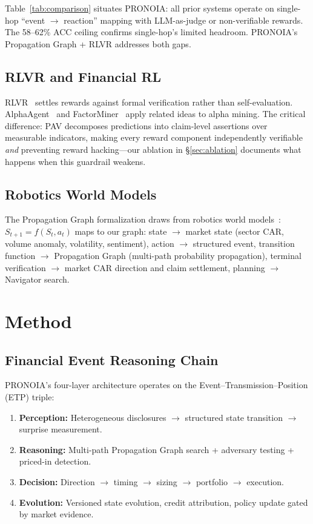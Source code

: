 \documentclass[sigconf, anonymous, review]{acmart}
\begin{document}
Table~\ref{tab:comparison} situates PRONOIA: all prior systems operate on single-hop ``event $\to$ reaction'' mapping with LLM-as-judge or non-verifiable rewards. The 58--62\% ACC ceiling confirms single-hop's limited headroom. PRONOIA's Propagation Graph + RLVR addresses both gaps.

\subsection{RLVR and Financial RL}

RLVR~\cite{rlvr2025} settles rewards against formal verification rather than self-evaluation. AlphaAgent~\cite{alphaagent2025} and FactorMiner~\cite{factorminer2026} apply related ideas to alpha mining. The critical difference: PAV decomposes predictions into claim-level assertions over measurable indicators, making every reward component independently verifiable \emph{and} preventing reward hacking---our ablation in \S\ref{sec:ablation} documents what happens when this guardrail weakens.

\subsection{Robotics World Models}

The Propagation Graph formalization draws from robotics world models~\cite{ha2018, schrittwieser2020}: $S_{t+1} = f(S_t, a_t)$ maps to our graph: state $\to$ market state (sector CAR, volume anomaly, volatility, sentiment), action $\to$ structured event, transition function $\to$ Propagation Graph (multi-path probability propagation), terminal verification $\to$ market CAR direction and claim settlement, planning $\to$ Navigator search.

\section{Method}

\subsection{Financial Event Reasoning Chain}

PRONOIA's four-layer architecture operates on the Event--Transmission--Position (ETP) triple:

\begin{enumerate}
    \item \textbf{Perception:} Heterogeneous disclosures $\to$ structured state transition $\to$ surprise measurement.
    \item \textbf{Reasoning:} Multi-path Propagation Graph search + adversary testing + priced-in detection.
    \item \textbf{Decision:} Direction $\to$ timing $\to$ sizing $\to$ portfolio $\to$ execution.
    \item \textbf{Evolution:} Versioned state evolution, credit attribution, policy update gated by market evidence.
\end{enumerate}
\end{document}
